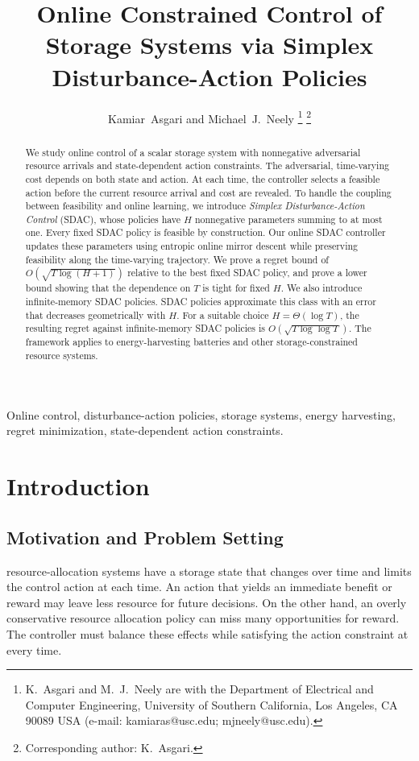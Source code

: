 \documentclass[journal]{IEEEtran}
\title{Online Constrained Control of Storage Systems via Simplex Disturbance-Action
Policies}
\author{Kamiar~Asgari and Michael~J.~Neely%
\thanks{K.~Asgari and M.~J.~Neely are with the Department of Electrical and
Computer Engineering, University of Southern California, Los Angeles, CA 90089 USA
(e-mail: kamiaras@usc.edu; mjneely@usc.edu).}%
\thanks{Corresponding author: K.~Asgari.}%
}
\theoremstyle{remark}
\begin{document}
\maketitle

\begin{abstract}
We study online control of a scalar storage system with nonnegative adversarial
resource arrivals and state-dependent action constraints. The adversarial,
time-varying cost depends on both state and action. At each time, the
controller selects a feasible action before the current resource arrival and cost
are revealed. To handle the coupling between feasibility and online learning,
we introduce \emph{Simplex Disturbance-Action Control} (SDAC), whose policies
have $H$ nonnegative parameters summing to at most one. Every fixed SDAC policy
is feasible by construction. Our online SDAC controller updates these
parameters using entropic online mirror descent while preserving feasibility along
the time-varying trajectory. We prove a regret bound of
$O\!\left(\sqrt{T\log(H+1)}\right)$ relative to the best fixed SDAC policy, and prove a
lower bound showing that the dependence on $T$ is tight for fixed $H$. We also introduce
infinite-memory SDAC policies.
SDAC policies approximate this class with an error that decreases geometrically
with $H$. For a suitable choice $H=\Theta(\log T)$,
the resulting regret against infinite-memory SDAC policies is
$O\!\left(\sqrt{T\log\log T}\right)$. The framework applies to energy-harvesting
batteries and other storage-constrained resource systems.
\end{abstract}

\begin{IEEEkeywords}
Online control, disturbance-action policies, storage systems, energy harvesting,
regret minimization, state-dependent action constraints.
\end{IEEEkeywords}

\section{Introduction}
\label{sec:introduction}

\subsection{Motivation and Problem Setting}
 resource-allocation systems have a storage state that changes
over time and limits the control action at each time. An action that yields an immediate
benefit or reward may leave less resource for future decisions. On the other hand, an
overly conservative resource allocation policy can miss many opportunities for reward. The
controller must balance these effects
while satisfying the action constraint at every time.
\end{document}
